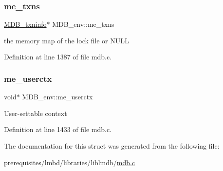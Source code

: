 \subsubsection{\texorpdfstring{me\+\_\+txns}{me\_txns}}
{\footnotesize\ttfamily \mbox{\hyperlink{struct_m_d_b__txninfo}{M\+D\+B\+\_\+txninfo}}$\ast$ M\+D\+B\+\_\+env\+::me\+\_\+txns}

the memory map of the lock file or N\+U\+LL 

Definition at line 1387 of file mdb.\+c.

\mbox{\label{struct_m_d_b__env_ac71142f4e056b082f9d866d1561764e5}} 
\subsubsection{\texorpdfstring{me\+\_\+userctx}{me\_userctx}}
{\footnotesize\ttfamily void$\ast$ M\+D\+B\+\_\+env\+::me\+\_\+userctx}

User-\/settable context 

Definition at line 1433 of file mdb.\+c.



The documentation for this struct was generated from the following file\+:\begin{DoxyCompactItemize}
\item 
prerequisites/lmbd/libraries/liblmdb/\mbox{\hyperlink{mdb_8c}{mdb.\+c}}\end{DoxyCompactItemize}
